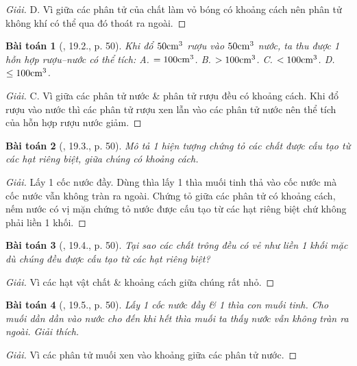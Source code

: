 \documentclass{article}
\newtheorem{baitoan}{Bài toán}
\begin{document}
\begin{proof}[Giải]
	{\sf D.} Vì giữa các phân tử của chất làm vỏ bóng có khoảng cách nên phân tử không khí có thể qua đó thoát ra ngoài.
\end{proof}

\begin{baitoan}[\cite{SBT_Vat_Ly_8}, 19.2., p. 50]
	Khi đổ $50{\rm cm}^3$ rượu vào $50{\rm cm}^3$ nước, ta thu được 1 hỗn hợp rượu--nước có thể tích: {\sf A.} $= 100{\rm cm}^3$. {\sf B.} $> 100{\rm cm}^3$. {\sf C.} $< 100{\rm cm}^3$. {\sf D.} $\le100{\rm cm}^3$.
\end{baitoan}

\begin{proof}[Giải]
	{\sf C.} Vì giữa các phân tử nước \& phân tử rượu đều có khoảng cách. Khi đổ rượu vào nước thì các phân tử rượu xen lẫn vào các phân tử nước nên thể tích của hỗn hợp rượu nước giảm.
\end{proof}

\begin{baitoan}[\cite{SBT_Vat_Ly_8}, 19.3., p. 50]
	Mô tả 1 hiện tượng chứng tỏ các chất được cấu tạo từ các hạt riêng biệt, giữa chúng có khoảng cách.
\end{baitoan}

\begin{proof}[Giải]
	Lấy 1 cốc nước đầy. Dùng thìa lấy 1 thìa muối tinh thả vào cốc nước mà cốc nước vẫn không tràn ra ngoài. Chứng tỏ giữa các phân tử có khoảng cách, nếm nước có vị mặn chứng tỏ nước được cấu tạo từ các hạt riêng biệt chứ không phải liền 1 khối.
\end{proof}

\begin{baitoan}[\cite{SBT_Vat_Ly_8}, 19.4., p. 50]
	Tại sao các chất trông đều có vẻ như liền 1 khối mặc dù chúng đều được cấu tạo từ các hạt riêng biệt?
\end{baitoan}

\begin{proof}[Giải]
	Vì các hạt vật chất \& khoảng cách giữa chúng rất nhỏ.
\end{proof}

\begin{baitoan}[\cite{SBT_Vat_Ly_8}, 19.5., p. 50]
	Lấy 1 cốc nước đầy \& 1 thìa con muối tinh. Cho muối dần dần vào nước cho đến khi hết thìa muối ta thấy nước vẫn không tràn ra ngoài. Giải thích.
\end{baitoan}

\begin{proof}[Giải]
	Vì các phân tử muối xen vào khoảng giữa các phân tử nước.
\end{proof}
\end{document}
